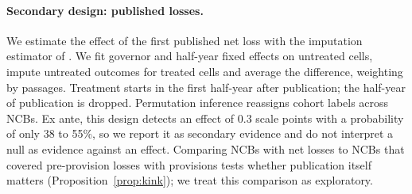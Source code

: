 \documentclass[11pt]{article}
\theoremstyle{plain}
\begin{document}
\paragraph{Secondary design: published losses.}
We estimate the effect of the first published net loss with the imputation estimator of \citet{borusyak2024}. We fit governor and half-year fixed effects on untreated cells, impute untreated outcomes for treated cells and average the difference, weighting by passages. Treatment starts in the first half-year after publication; the half-year of publication is dropped. Permutation inference reassigns cohort labels across NCBs. Ex ante, this design detects an effect of $0.3$ scale points with a probability of only 38 to 55\%, so we report it as secondary evidence and do not interpret a null as evidence against an effect. Comparing NCBs with net losses to NCBs that covered pre-provision losses with provisions tests whether publication itself matters (Proposition~\ref{prop:kink}); we treat this comparison as exploratory.
\end{document}
